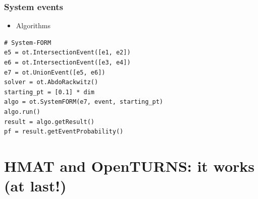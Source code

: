 \documentclass{beamer}
\begin{document}
\begin{frame}[containsverbatim]
\frametitle{System events}

\lstset{language=python}

\begin{itemize}
\item Algorithms
\end{itemize}
\begin{lstlisting}
# System-FORM
e5 = ot.IntersectionEvent([e1, e2])
e6 = ot.IntersectionEvent([e3, e4])
e7 = ot.UnionEvent([e5, e6])
solver = ot.AbdoRackwitz()
starting_pt = [0.1] * dim
algo = ot.SystemFORM(e7, event, starting_pt)
algo.run()
result = algo.getResult()
pf = result.getEventProbability()
\end{lstlisting}

\end{frame}




\section{HMAT and OpenTURNS: it works (at last!)}
\end{document}
